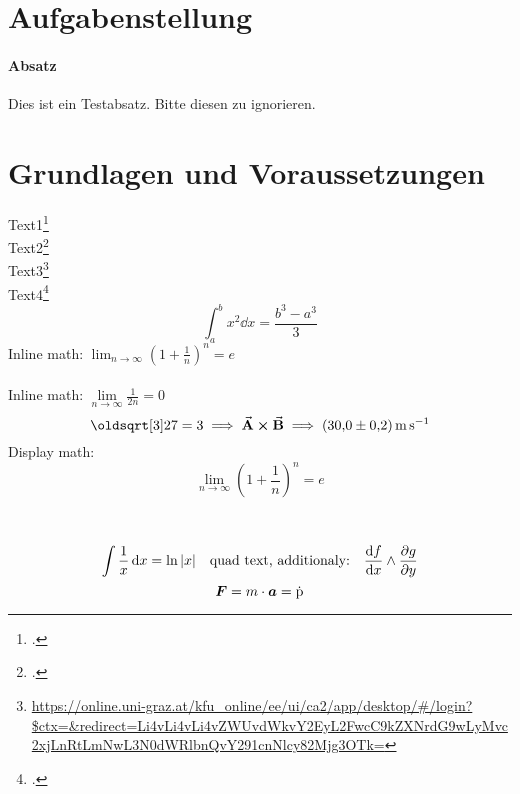 \documentclass[ngerman]{scrartcl}
\begin{document}


\clearpage
\tableofcontents
\newpage

\section{Aufgabenstellung}
\label{sec:aufgabenstellung}

\paragraph{Absatz}
\label{par:absatz}

Dies ist ein Testabsatz. Bitte diesen zu ignorieren.



\section{Grundlagen und Voraussetzungen}
\label{sec:grundlagen_voraussetzungen}

Text1\footcite[1000]{ref:dem1} \\
Text2\footcite[Kapitel 74]{ref:knoll} \\
Text3\footnote{\url{https://online.uni-graz.at/kfu_online/ee/ui/ca2/app/desktop/\#/login?$ctx=&redirect=Li4vLi4vLi4vZWUvdWkvY2EyL2FwcC9kZXNrdG9wLyMvc2xjLnRtLmNwL3N0dWRlbnQvY291cnNlcy82Mjg3OTk=}} \\  %
Text4\footcite{ref:genol2013}
%
\begin{equation}
    \label{eq:grenzen-oben-unten}
    \int_a^b x^2 \dd{x} =\frac{b^3-a^3}{3}  %
\end{equation}
%
Inline math: \(\lim_{n \to \infty} \left( 1 + \frac{1}{n} \right) ^{n} = e\)  \\ \\ %
Inline math: $\lim \limits_{n \to \infty} \frac{1}{2n} = 0$  %
%
\begin{displaymath}
    \sqrt[3]{27} = 3 \implies \va{A} \cross \va{B} \implies \SI{30.0(2)}{\meter\per\second}
\end{displaymath}
%
Display math: \[\lim_{n \to \infty} \left( 1 + \frac{1}{n} \right) ^{n} = e\]  \\ \\ %
\[ \int \frac{1}{x} \dd{x} = \ln|x| \qq{quad text, additionaly:} \dv{f}{x} \land \pdv{g}{y}\]  %
$$ \vb*{F} = m \cdot \vb*{a} = \dot{\text{\textup{p}}}$$  %
\end{document}
